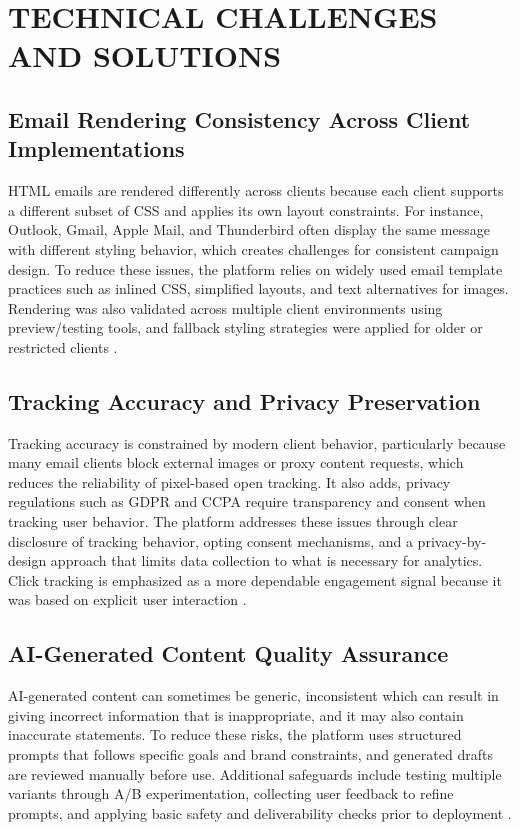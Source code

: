\documentclass[12pt,journal,compsoc]{IEEEtran}
\begin{document}
\section{TECHNICAL CHALLENGES AND SOLUTIONS}

\subsection{Email Rendering Consistency Across Client Implementations}
HTML emails are rendered differently across clients because each client supports a different subset of CSS and applies its own layout constraints. For instance, Outlook, Gmail, Apple Mail, and Thunderbird often display the same message with different styling behavior, which creates challenges for consistent campaign design. To reduce these issues, the platform relies on widely used email template practices such as inlined CSS, simplified layouts, and text alternatives for images. Rendering was also validated across multiple client environments using preview/testing tools, and fallback styling strategies were applied for older or restricted clients \cite{ref15}.

\subsection{Tracking Accuracy and Privacy Preservation}
Tracking accuracy is constrained by modern client behavior, particularly because many email clients block external images or proxy content requests, which reduces the reliability of pixel-based open tracking. It also adds, privacy regulations such as GDPR and CCPA require transparency and consent when tracking user behavior. The platform addresses these issues through clear disclosure of tracking behavior, opting consent mechanisms, and a privacy-by-design approach that limits data collection to what is necessary for analytics. Click tracking is emphasized as a more dependable engagement signal because it was based on explicit user interaction \cite{ref15,ref21}.

\subsection{AI-Generated Content Quality Assurance}
AI-generated content can sometimes be generic, inconsistent which can result in giving incorrect information that is inappropriate, and it may also contain inaccurate statements. To reduce these risks, the platform uses structured prompts that follows specific goals and brand constraints, and generated drafts are reviewed manually before use. Additional safeguards include testing multiple variants through A/B experimentation, collecting user feedback to refine prompts, and applying basic safety and deliverability checks prior to deployment \cite{ref4,ref7}.
\end{document}
